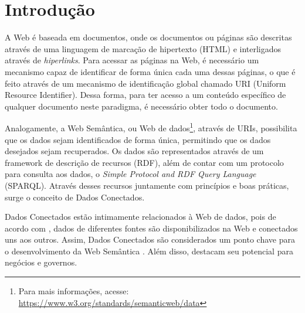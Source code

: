 \chapter{Introdução}
\label{cap:introducao}
A Web é baseada em documentos, onde os documentos ou páginas são descritas através de uma linguagem de marcação de hipertexto (HTML) e interligados através de \textit{hiperlinks}. Para acessar as páginas na Web, é necessário um mecanismo capaz de identificar de forma única cada uma dessas páginas, o que é feito através de um mecanismo de identificação global chamado URI (Uniform Resource Identifier). Dessa forma, para ter acesso a um conteúdo específico de qualquer documento neste paradigma, é necessário obter todo o documento.

Analogamente, a Web Semântica, ou Web de dados\footnote{Para mais informações, acesse: \url{https://www.w3.org/standards/semanticweb/data}}, através de URIs, possibilita que os dados sejam identificados de forma única, permitindo que os dados desejados sejam recuperados. Os dados são representados através de um framework de descrição de recursos (RDF), além de contar com um protocolo para consulta aos dados, o \textit{Simple Protocol and RDF Query Language} (SPARQL). Através desses recursos juntamente com princípios e boas práticas, surge o conceito de Dados Conectados.

 
Dados Conectados estão intimamente relacionados à Web de dados, pois de acordo com , dados de diferentes fontes são disponibilizados na Web e conectados uns aos outros. Assim, Dados Conectados são considerados um ponto chave para o desenvolvimento da Web Semântica \cite{berners2001semantic}. Além disso,  destacam seu potencial para negócios e governos.  

